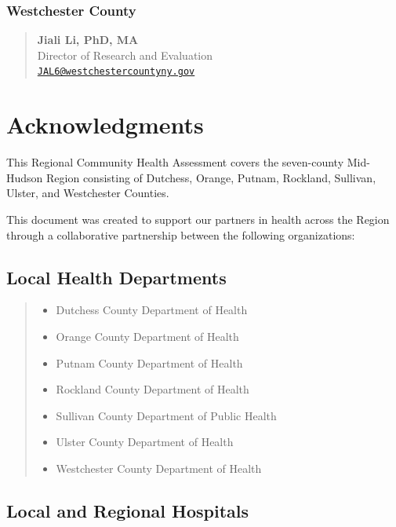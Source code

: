 \documentclass[
  english,
  letterpaper,
]{report}
\providecommand{\tightlist}{%
  \setlength{\itemsep}{0pt}\setlength{\parskip}{0pt}}
\begin{document}
\subsection{Westchester County}\label{westchester-county}

\begin{quote}
\textbf{Jiali Li, PhD, MA}\\
Director of Research and Evaluation\\
\href{mailto:JAL6@westchestercountyny.gov}{\nolinkurl{JAL6@westchestercountyny.gov}}
\end{quote}


\chapter{Acknowledgments}\label{acknowledgments}

This Regional Community Health Assessment covers the seven-county
Mid-Hudson Region consisting of Dutchess, Orange, Putnam, Rockland,
Sullivan, Ulster, and Westchester Counties.

This document was created to support our partners in health across the
Region through a collaborative partnership between the following
organizations:

\section{Local Health Departments}\label{local-health-departments}

\begin{quote}
\begin{itemize}
\tightlist
\item
  Dutchess County Department of Health
\item
  Orange County Department of Health
\item
  Putnam County Department of Health
\item
  Rockland County Department of Health
\item
  Sullivan County Department of Public Health
\item
  Ulster County Department of Health
\item
  Westchester County Department of Health
\end{itemize}
\end{quote}

\section{Local and Regional
Hospitals}\label{local-and-regional-hospitals}
\end{document}
